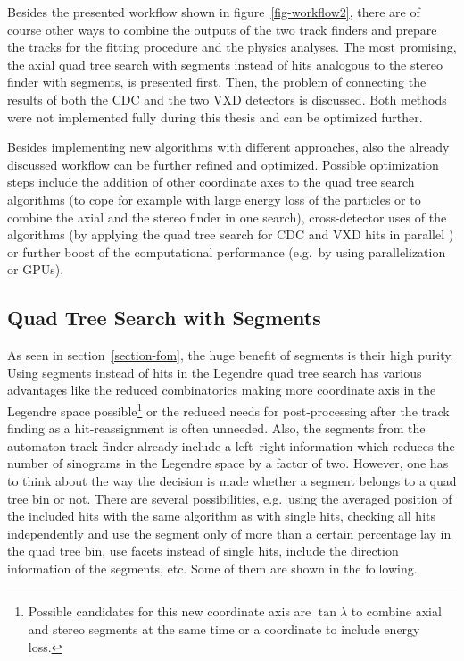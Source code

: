 Besides the presented workflow shown in figure~\ref{fig-workflow2}, there are of course other ways to combine the outputs of the two track finders and prepare the tracks for the fitting procedure and the physics analyses. The most promising, the axial quad tree search with segments instead of hits analogous to the stereo finder with segments, is presented first. Then, the problem of connecting the results of both the CDC and the two VXD detectors is discussed. Both methods were not implemented fully during this thesis and can be optimized further.

Besides implementing new algorithms with different approaches, also the already discussed workflow can be further refined and optimized. Possible optimization steps include the addition of other coordinate axes to the quad tree search algorithms (to cope for example with large energy loss of the particles or to combine the axial and the stereo finder in one search), cross-detector uses of the algorithms (by applying the quad tree search for CDC and VXD hits in parallel \cite{markus}) or further boost of the computational performance (e.g.\ by using parallelization or GPUs).

\subsection{Quad Tree Search with Segments}

As seen in section~\ref{section-fom}, the huge benefit of segments is their high purity. Using segments instead of hits in the Legendre quad tree search has various advantages like the reduced combinatorics making more coordinate axis in the Legendre space possible\footnote{Possible candidates for this new coordinate axis are $\tan \lambda$ to combine axial and stereo segments at the same time or a coordinate to include energy loss.} or the reduced needs for post-processing after the track finding as a hit-reassignment is often unneeded. Also, the segments from the automaton track finder already include a left--right-information which reduces the number of sinograms in the Legendre space by a factor of two. However, one has to think about the way the decision is made whether a segment belongs to a quad tree bin or not. There are several possibilities, e.g.\ using the averaged position of the included hits with the same algorithm as with single hits, checking all hits independently and use the segment only of more than a certain percentage lay in the quad tree bin, use facets instead of single hits, include the direction information of the segments, etc. Some of them are shown in the following.

